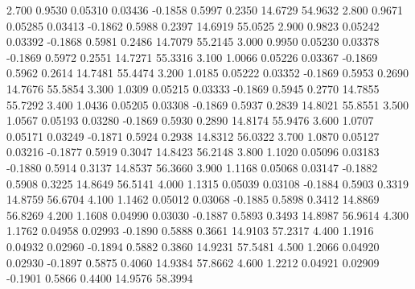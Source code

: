    2.700   0.9530   0.05310   0.03436  -0.1858   0.5997   0.2350  14.6729  54.9632
   2.800   0.9671   0.05285   0.03413  -0.1862   0.5988   0.2397  14.6919  55.0525
   2.900   0.9823   0.05242   0.03392  -0.1868   0.5981   0.2486  14.7079  55.2145
   3.000   0.9950   0.05230   0.03378  -0.1869   0.5972   0.2551  14.7271  55.3316
   3.100   1.0066   0.05226   0.03367  -0.1869   0.5962   0.2614  14.7481  55.4474
   3.200   1.0185   0.05222   0.03352  -0.1869   0.5953   0.2690  14.7676  55.5854
   3.300   1.0309   0.05215   0.03333  -0.1869   0.5945   0.2770  14.7855  55.7292
   3.400   1.0436   0.05205   0.03308  -0.1869   0.5937   0.2839  14.8021  55.8551
   3.500   1.0567   0.05193   0.03280  -0.1869   0.5930   0.2890  14.8174  55.9476
   3.600   1.0707   0.05171   0.03249  -0.1871   0.5924   0.2938  14.8312  56.0322
   3.700   1.0870   0.05127   0.03216  -0.1877   0.5919   0.3047  14.8423  56.2148
   3.800   1.1020   0.05096   0.03183  -0.1880   0.5914   0.3137  14.8537  56.3660
   3.900   1.1168   0.05068   0.03147  -0.1882   0.5908   0.3225  14.8649  56.5141
   4.000   1.1315   0.05039   0.03108  -0.1884   0.5903   0.3319  14.8759  56.6704
   4.100   1.1462   0.05012   0.03068  -0.1885   0.5898   0.3412  14.8869  56.8269
   4.200   1.1608   0.04990   0.03030  -0.1887   0.5893   0.3493  14.8987  56.9614
   4.300   1.1762   0.04958   0.02993  -0.1890   0.5888   0.3661  14.9103  57.2317
   4.400   1.1916   0.04932   0.02960  -0.1894   0.5882   0.3860  14.9231  57.5481
   4.500   1.2066   0.04920   0.02930  -0.1897   0.5875   0.4060  14.9384  57.8662
   4.600   1.2212   0.04921   0.02909  -0.1901   0.5866   0.4400  14.9576  58.3994
